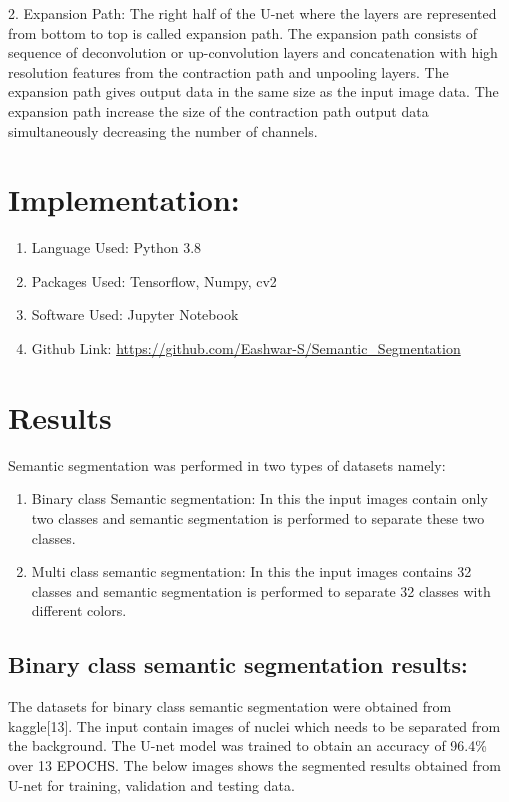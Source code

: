 \documentclass{IEEEtran}
\begin{document}
2. Expansion Path: The right half of the U-net where the layers are represented from bottom to top is called expansion path. The expansion path consists of sequence of deconvolution or up-convolution layers and concatenation with high resolution features from the contraction path and unpooling layers. The expansion path gives output data in the same size as the input image data. The expansion path increase the size of the contraction path output data simultaneously decreasing the number of channels.

\section{\textbf{Implementation:}}
\begin{enumerate}
\item Language Used: Python 3.8

\item Packages Used: Tensorflow, Numpy, cv2

\item Software Used: Jupyter Notebook

\item Github Link: \url{https://github.com/Eashwar-S/Semantic_Segmentation}

\end{enumerate}

\section{\textbf{Results}}
Semantic segmentation was performed in two types of datasets namely:
\begin{enumerate}
\item Binary class Semantic segmentation: In this the input images contain only two classes and semantic segmentation is performed to separate these two classes.

\item Multi class semantic segmentation: In this the input images contains 32 classes and semantic segmentation is performed to separate 32 classes with different colors.
\end{enumerate}

\subsection{\textbf{Binary class semantic segmentation results:}}
The datasets for binary class semantic segmentation were obtained from kaggle[13]. The input contain images of nuclei which needs to be separated from the background. The U-net model was trained to obtain an accuracy of 96.4\% over 13 EPOCHS. The below images shows the segmented results obtained from U-net for training, validation and testing data.
\end{document}
